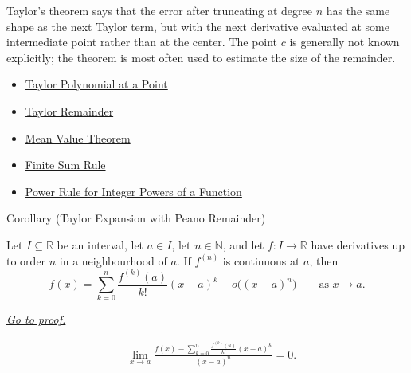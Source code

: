 \begin{remark*}[Interpretation]
Taylor's theorem says that the error after truncating at degree $n$ has the
same shape as the next Taylor term, but with the next derivative evaluated at
some intermediate point rather than at the center. The point $c$ is generally
not known explicitly; the theorem is most often used to estimate the size of
the remainder.
\end{remark*}

\begin{remark*}[Dependencies]\hfill
\begin{itemize}
  \item \hyperref[def:taylor-polynomial-at-a-point]{Taylor Polynomial at a Point}
  \item \hyperref[def:taylor-remainder]{Taylor Remainder}
  \item \hyperref[thm:mean-value-theorem]{Mean Value Theorem}
  \item \hyperref[cor:finite-sum-rule]{Finite Sum Rule}
  \item \hyperref[cor:power-rule-special-case]{Power Rule for Integer Powers of a Function}
\end{itemize}
\end{remark*}


\begin{corollarybox}{Corollary (Taylor Expansion with Peano Remainder)}
\begin{corollary}
\label{cor:taylor-expansion-peano-remainder}
Let $I\subseteq\mathbb{R}$ be an interval, let $a\in I$, let
$n\in\mathbb{N}$, and let $f:I\to\mathbb{R}$ have derivatives up to order
$n$ in a neighbourhood of $a$. If $f^{(n)}$ is continuous at $a$, then
\[
  f(x)
  =
  \sum_{k=0}^{n}\frac{f^{(k)}(a)}{k!}(x-a)^k
  +
  o\bigl((x-a)^n\bigr)
  \qquad\text{as }x\to a.
\]

\smallskip
\noindent
\hyperref[prf:taylor-expansion-peano-remainder]{\textit{Go to proof.}}
\end{corollary}
\end{corollarybox}

\begin{remark*}
\[
\begin{aligned}
&\lim_{x\to a}
\frac{
  f(x)-\sum_{k=0}^{n}\frac{f^{(k)}(a)}{k!}(x-a)^k
}{
  (x-a)^n
}
=0.
\end{aligned}
\]
\end{remark*}

